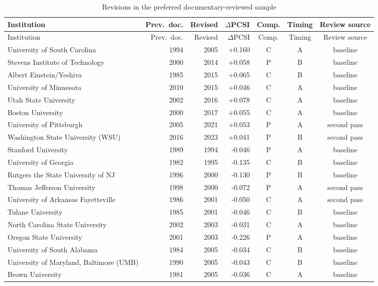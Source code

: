 {\scriptsize
\begin{longtable}{p{5.5cm}rrrccc}
\caption{Revisions in the preferred documentary-reviewed sample}\label{tab:events}\\
\toprule
Institution & Prev.\ doc. & Revised & $\Delta$PCSI & Comp. & Timing & Review source \\\midrule
\endfirsthead
\toprule
Institution & Prev.\ doc. & Revised & $\Delta$PCSI & Comp. & Timing & Review source \\\midrule
\endhead
University of South Carolina & 1994 & 2005 & +0.160 & C & A & baseline \\
Stevens Institute of Technology & 2000 & 2014 & +0.058 & P & B & baseline \\
Albert Einstein/Yeshiva & 1985 & 2015 & +0.065 & C & B & baseline \\
University of Minnesota & 2010 & 2015 & +0.046 & C & A & baseline \\
Utah State University & 2002 & 2016 & +0.078 & C & A & baseline \\
Boston University & 2000 & 2017 & +0.055 & C & A & baseline \\
University of Pittsburgh & 2005 & 2021 & +0.053 & P & A & second pass \\
Washington State University (WSU) & 2016 & 2023 & +0.041 & P & B & second pass \\
Stanford University & 1989 & 1994 & -0.046 & P & A & baseline \\
University of Georgia & 1982 & 1995 & -0.135 & C & B & baseline \\
Rutgers the State University of NJ & 1996 & 2000 & -0.130 & P & B & baseline \\
Thomas Jefferson University & 1998 & 2000 & -0.072 & P & A & second pass \\
University of Arkansas Fayetteville & 1986 & 2001 & -0.050 & C & A & second pass \\
Tulane University & 1985 & 2001 & -0.046 & C & B & baseline \\
North Carolina State University & 2002 & 2003 & -0.031 & C & A & baseline \\
Oregon State University & 2001 & 2003 & -0.226 & P & A & baseline \\
University of South Alabama & 1984 & 2005 & -0.034 & C & B & baseline \\
University of Maryland, Baltimore (UMB) & 1990 & 2005 & -0.043 & C & B & baseline \\
Brown University & 1981 & 2005 & -0.036 & C & A & baseline \\

\end{longtable}}
